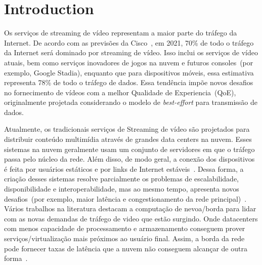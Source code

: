 \section{Introduction}
\label{ch:introduction}



Os serviços de streaming de vídeo representam a maior parte do tráfego da Internet. De acordo com as previsões da Cisco~\cite{cisco:forecast},
em 2021, 70\% de todo o tráfego da Internet será dominado por streaming de vídeo. Isso inclui os serviços de vídeo atuais, bem como serviços inovadores de jogos na nuvem e futuros consoles~(por exemplo, Google Stadia), enquanto que para dispositivos móveis, essa estimativa representa 78\% de todo o tráfego de dados. Essa tendência impõe novos desafios no fornecimento de vídeos com a melhor Qualidade de Experiencia~(QoE), originalmente projetada considerando o modelo de \textit{best-effort} para transmissão de dados.

Atualmente, os tradicionais serviços de Streaming de vídeo são projetados para distribuir conteúdo multimídia através de grandes data centers na nuvem. Esses sistemas na nuvem geralmente usam um conjunto de servidores em que o tráfego passa pelo núcleo da rede. Além disso, de modo geral, a conexão dos dispositivos é feita por usuários estáticos e por links de Internet estáveis~\cite{sitaraman:ACD2014}. Dessa forma, a criação desses sistemas resolve parcialmente os problemas de escalabilidade, disponibilidade e interoperabilidade, mas ao mesmo tempo, apresenta novos desafios~(por exemplo, maior latência e congestionamento da rede principal)~\cite{tran:wons17,ye:ITC17,taleb:JSAC18}. Vários trabalhos na literatura destacam a computação de nevoa/borda para lidar com as novas demandas de tráfego de video que estão surgindo. Onde datacenters com menos capacidade de processamento e armazenamento conseguem prover serviços/virtualização mais próximos ao usuário final. Assim, a borda da rede pode fornecer taxas de latência que a nuvem não conseguem alcançar de outra forma~\cite{gamaUCC2019, rosarioSENSORS2018}.

